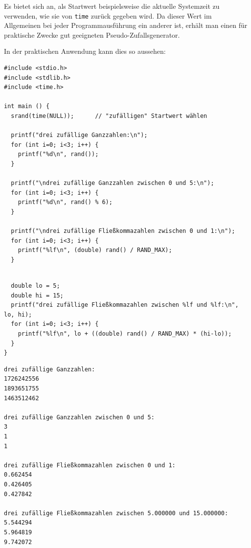 Es bietet sich an, als Startwert beispielsweise die aktuelle Systemzeit zu verwenden, wie sie von \texttt{time} zurück gegeben wird. Da dieser Wert im Allgemeinen bei jeder Programmausführung ein anderer ist, erhält man einen für praktische Zwecke gut geeigneten Pseudo-Zufallsgenerator.

In der praktischen Anwendung kann dies so aussehen:
\begin{codebox}
\begin{verbatim}
#include <stdio.h>
#include <stdlib.h>
#include <time.h>

int main () {
  srand(time(NULL));      // "zufälligen" Startwert wählen
  
  printf("drei zufällige Ganzzahlen:\n");
  for (int i=0; i<3; i++) {
    printf("%d\n", rand());
  }
  
  printf("\ndrei zufällige Ganzzahlen zwischen 0 und 5:\n");
  for (int i=0; i<3; i++) {
    printf("%d\n", rand() % 6);
  }
  
  printf("\ndrei zufällige Fließkommazahlen zwischen 0 und 1:\n");
  for (int i=0; i<3; i++) {
    printf("%lf\n", (double) rand() / RAND_MAX);
  }
\end{verbatim}
\end{codebox}
%
\begin{codebox}[]
\begin{verbatim}
  
  double lo = 5;
  double hi = 15;
  printf("drei zufällige Fließkommazahlen zwischen %lf und %lf:\n", lo, hi);
  for (int i=0; i<3; i++) {
    printf("%lf\n", lo + ((double) rand() / RAND_MAX) * (hi-lo));
  }
}
\end{verbatim}
\end{codebox}

\begin{cmdbox}
\begin{verbatim}
drei zufällige Ganzzahlen:
1726242556
1893651755
1463512462

drei zufällige Ganzzahlen zwischen 0 und 5:
3
1
1

drei zufällige Fließkommazahlen zwischen 0 und 1:
0.662454
0.426405
0.427842

drei zufällige Fließkommazahlen zwischen 5.000000 und 15.000000:
5.544294
5.964819
9.742072
\end{verbatim}
\end{cmdbox}

